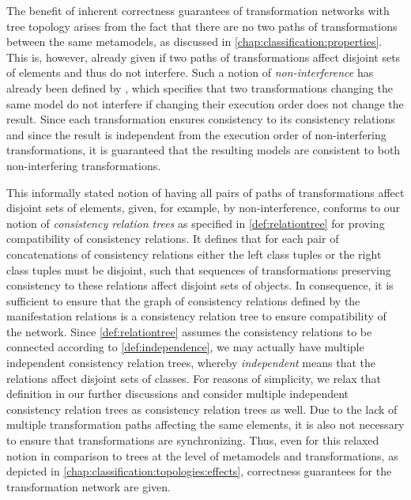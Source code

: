 The benefit of inherent correctness guarantees of transformation networks with tree topology arises from the fact that there are no two paths of transformations between the same metamodels, as discussed in \autoref{chap:classification:properties}.
This is, however, already given if two paths of transformations affect disjoint sets of elements and thus do not interfere.
Such a notion of \emph{non-interference} has already been defined by \textcite{stevens2020BidirectionalTransformationLarge-SoSym}, which specifies that two transformations changing the same model do not interfere if changing their execution order does not change the result.
Since each transformation ensures consistency to its consistency relations and since the result is independent from the execution order of non-interfering transformations, it is guaranteed that the resulting models are consistent to both non-interfering transformations.

This informally stated notion of having all pairs of paths of transformations affect disjoint sets of elements, given, for example, by non-interference, conforms to our notion of \emph{consistency relation trees} as specified in \autoref{def:relationtree} for proving compatibility of consistency relations.
It defines that for each pair of concatenations of consistency relations either the left class tuples or the right class tuples must be disjoint, such that sequences of transformations preserving consistency to these relations affect disjoint sets of objects.
In consequence, it is sufficient to ensure that the graph of consistency relations defined by the manifestation relations is a consistency relation tree to ensure compatibility of the network.
Since \autoref{def:relationtree} assumes the consistency relations to be connected according to \autoref{def:independence}, we may actually have multiple independent consistency relation trees, whereby \emph{independent} means that the relations affect disjoint sets of classes.
For reasons of simplicity, we relax that definition in our further discussions and consider multiple independent consistency relation trees as consistency relation trees as well.
Due to the lack of multiple transformation paths affecting the same elements, it is also not necessary to ensure that transformations are synchronizing.
Thus, even for this relaxed notion in comparison to trees at the level of metamodels and transformations, as depicted in \autoref{chap:classification:topologies:effects}, correctness guarantees for the transformation network are given.

